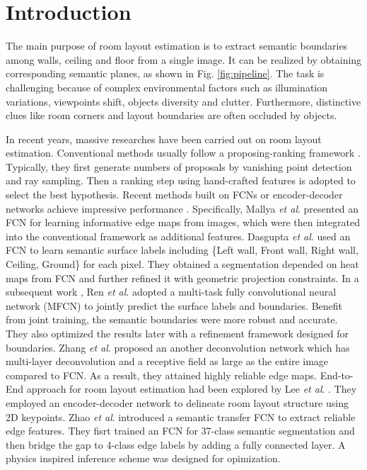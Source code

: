 \section{Introduction}
\label{sec:intro}

The main purpose of room layout estimation is to extract semantic boundaries among walls, ceiling and floor from a single image. It can be realized by obtaining corresponding semantic planes, as shown in Fig. \ref{fig:pipeline}. The task is challenging because of complex environmental factors such as illumination variations, viewpoints shift, objects diversity and clutter. Furthermore, distinctive clues like room corners and layout boundaries are often occluded by objects. 

In recent years, massive researches have been carried out on room layout estimation. Conventional methods usually follow a proposing-ranking framework \cite{hedau2009recovering,wang2013discriminative,gupta2010estimating,hedau2010thinking}. Typically, they first generate numbers of proposals by vanishing point detection and ray sampling. Then a ranking step using hand-crafted features is adopted to select the best hypothesis. Recent methods built on FCNs \cite{long2015fully} or encoder-decoder networks achieve impressive performance \cite{mallya2015learning,ren2016coarse,zhang2016learning,dasgupta2016delay,LeeRoomNet17,zhao2017physics}. Specifically, 
%
Mallya \emph{et al}. \cite{mallya2015learning} presented an FCN for learning informative edge maps from images, which were then integrated into the conventional framework as additional features. 
%
Dasgupta \emph{et al}. \cite{dasgupta2016delay} used an FCN to learn semantic surface labels including \{Left wall, Front wall, Right wall, Ceiling, Ground\} for each pixel. They obtained a segmentation depended on heat maps from FCN and further refined it with geometric projection constraints.
% 
In a subsequent work \cite{ren2016coarse}, Ren \emph{et al}. adopted a multi-task fully convolutional neural network (MFCN) to jointly predict the surface labels and boundaries. Benefit from joint training, the semantic boundaries were more robust and accurate. They also optimized the results later with a refinement framework designed for boundaries.
% 
Zhang \emph{et al}. \cite{zhang2016learning} proposed an another deconvolution network which has multi-layer deconvolution and a receptive field as large as the entire image compared to FCN. As a result, they attained highly reliable edge maps. 
%
End-to-End approach for room layout estimation had been explored by Lee \emph{et al}. \cite{LeeRoomNet17}. They employed an encoder-decoder network to delineate room layout structure using 2D keypoints.
%
Zhao \emph{et al}. \cite{zhao2017physics} introduced a semantic transfer FCN to extract reliable edge features. They fisrt trained an FCN for 37-class semantic segmentation and then bridge the gap to 4-class edge labels by adding a fully connected layer. A physics inspired inference scheme was designed for opimization.



